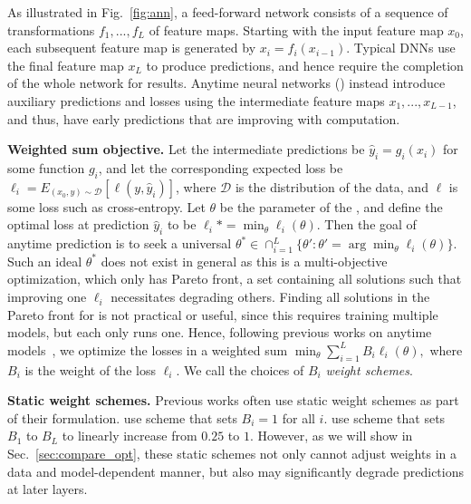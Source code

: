 \label{sec:multi_objective}

As illustrated in Fig.~\ref{fig:ann}, a feed-forward network consists of a sequence of transformations $f_1,...,f_L$ of feature maps. Starting with the input feature map $x_0$, each subsequent feature map is generated by $x_i = f_i(x_{i-1})$.  Typical DNNs use the final feature map $x_L$ to produce predictions, and hence require the completion of the whole network for results. Anytime neural networks (\anns) instead introduce auxiliary predictions and losses using the intermediate feature maps $x_1,...,x_{L-1}$, and thus, have early predictions that are improving with computation. 




\textbf{Weighted sum objective.} Let the intermediate predictions be $\hat{y}_i = g_i(x_i)$ for some function $g_i$, and let the corresponding expected loss be $\ell_i = E_{(x_0,y)\sim \mathcal{D}} [\ell(y, \hat{y}_i)]$, where $\mathcal{D}$ is the distribution of the data, and $\ell$ is some loss such as cross-entropy.  Let $\theta$ be the parameter of the \ann, and define the optimal loss at prediction $\hat{y}_i$ to be $\ell_i* = \min _{\theta}  \ell_i(\theta)$. Then the goal of anytime prediction is to seek a universal 
$
    \theta^* \in \cap _{i=1}^L \{ \theta' : \theta' = \arg \min _{\theta} \ell _i(\theta) \}.
    \label{eq:multi-objective}
$
Such an ideal $\theta^*$ does not exist in general as this is a multi-objective optimization, which only has Pareto front, a set containing all solutions such that improving one $\ell_i$ necessitates degrading others. Finding all solutions in the Pareto front for \anns is not practical or useful, since this requires training multiple models, but each \ann only runs one. Hence, following previous works on anytime models~\cite{supervisednet,feedbacknet,msdense}, we optimize the losses in a weighted sum
$
    \min _{\theta} \sum _{i=1}^L B_i \ell_i (\theta),
    \label{eq:sum-objective}
$
where $B_i$ is the weight of the loss $\ell_i$. We call the choices of $B_i$ \textit{weight schemes}. 



\textbf{Static weight schemes.} Previous works often use static weight schemes as part of their formulation. \cite{supervisednet,hed,msdense} use \const scheme that sets $B_i =1$ for all $i$. \cite{feedbacknet} use \linear scheme that sets $B_1$ to $B_L$ to linearly increase from $0.25$ to $1$. However, as we will show in Sec.~\ref{sec:compare_opt}, these static schemes not only cannot adjust weights in a data and model-dependent manner, but also may significantly degrade predictions at later layers.

